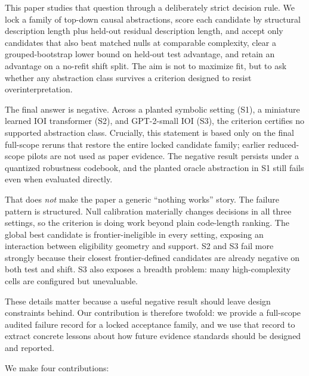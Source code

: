 \documentclass[10pt]{article}
\begin{document}
This paper studies that question through a deliberately strict decision rule. We lock a family of top-down causal abstractions, score each candidate by structural description length plus held-out residual description length, and accept only candidates that also beat matched nulls at comparable complexity, clear a grouped-bootstrap lower bound on held-out test advantage, and retain an advantage on a no-refit shift split. The aim is not to maximize fit, but to ask whether any abstraction class survives a criterion designed to resist overinterpretation.

The final answer is negative. Across a planted symbolic setting (S1), a miniature learned IOI transformer (S2), and GPT-2-small IOI (S3), the criterion certifies no supported abstraction class. Crucially, this statement is based only on the final full-scope reruns that restore the entire locked candidate family; earlier reduced-scope pilots are not used as paper evidence. The negative result persists under a quantized robustness codebook, and the planted oracle abstraction in S1 still fails even when evaluated directly.

That does \emph{not} make the paper a generic ``nothing works'' story. The failure pattern is structured. Null calibration materially changes decisions in all three settings, so the criterion is doing work beyond plain code-length ranking. The global best candidate is frontier-ineligible in every setting, exposing an interaction between eligibility geometry and support. S2 and S3 fail more strongly because their closest frontier-defined candidates are already negative on both test and shift. S3 also exposes a breadth problem: many high-complexity cells are configured but unevaluable.

These details matter because a useful negative result should leave design constraints behind. Our contribution is therefore twofold: we provide a full-scope audited failure record for a locked acceptance family, and we use that record to extract concrete lessons about how future evidence standards should be designed and reported.

We make four contributions:
\end{document}
